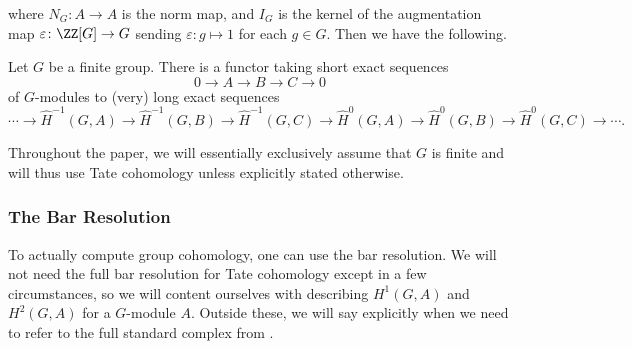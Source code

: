 where $N_G\colon A\to A$ is the norm map, and $I_G$ is the kernel of the augmentation map $\varepsilon\colon\ZZ[G]\to G$ sending $\varepsilon\colon g\mapsto1$ for each $g\in G$. Then we have the following.
\begin{theorem}
	Let $G$ be a finite group. There is a functor taking short exact sequences
	\[0\to A\to B\to C\to 0\]
	of $G$-modules to (very) long exact sequences
	\[\cdots\to\widehat H^{-1}(G,A)\to\widehat H^{-1}(G,B)\to\widehat H^{-1}(G,C)\to\widehat H^0(G,A)\to\widehat H^0(G,B)\to\widehat H^0(G,C)\to\cdots.\]
\end{theorem}
Throughout the paper, we will essentially exclusively assume that $G$ is finite and will thus use Tate cohomology unless explicitly stated otherwise.

\subsubsection{The Bar Resolution} \label{sec:barres}
To actually compute group cohomology, one can use the bar resolution. We will not need the full bar resolution for Tate cohomology except in a few circumstances, so we will content ourselves with describing $H^1(G,A)$ and $H^2(G,A)$ for a $G$-module $A$. Outside these, we will say explicitly when we need to refer to the full standard complex from \cite{atiyah-wall}.

